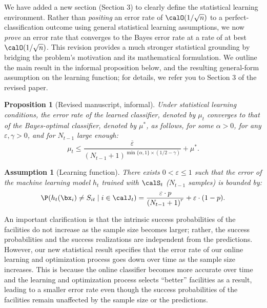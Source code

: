 \documentclass[11pt]{article}
\newtheorem{proposition}{Proposition}[]
\newtheorem{assumption}{Assumption}[]
\begin{document}
We have added a new section (Section 3) to clearly define the statistical learning environment. Rather than \textit{positing} an error rate of $\calO(1/\sqrt n)$ to a perfect-classification outcome using general statistical learning assumptions, we now \textit{prove} an error rate that converges to the Bayes error rate at a rate of at best $\calO(1/\sqrt n)$. This revision provides a much stronger statistical grounding by bridging the problem's motivation and its mathematical formulation. We outline the main result in the informal proposition below, and the resulting general-form assumption on the learning function; for details, we refer you to Section 3 of the revised paper.
\setcounter{proposition}{0}
\begin{proposition}[Revised manuscript, informal]\label{prop:MLE_informal_R3}
       Under statistical learning conditions, the error rate of the learned classifier, denoted by $\mu_t$ converges to that of the Bayes-optimal classifier, denoted by $\mu^*$, as follows, for some $\alpha>0$, for any $\varepsilon,\gamma>0$, and for $N_{t-1}$ large enough:
        \[\mu_t \leq \frac{\overline\varepsilon}{(N_{t-1}+1)^{\min\{\alpha,1\}\times (1/2-\gamma)}}+\mu^*.\]
\end{proposition}
\setcounter{assumption}{3}
\begin{assumption}[Learning function] \label{ass:classification_R3}
    There exists $0<\varepsilon\leq 1$ such that the error of the machine learning model $h_t$ trained with $\calS_t$ ($N_{t-1}$ samples) is bounded by:
    \begin{align*}
        \P(h_t(\bx_{i})\neq S_{it} \mid i \in \calJ_t)=\frac{\varepsilon\cdot p}{\left(N_{t-1} + 1\right)^r}+\varepsilon\cdot(1-p).
    \end{align*}
\end{assumption}

An important clarification is that the intrinsic success probabilities of the facilities do not increase as the sample size becomes larger; rather, the success probabilities and the success realizations are independent from the predictions. However, our new statistical result specifies that the error rate of our online learning and optimization process goes down over time as the sample size increases. This is because the online classifier becomes more accurate over time and the learning and optimization process selects ``better'' facilities as a result, leading to a smaller error rate even though the success probabilities of the facilities remain unaffected by the sample size or the predictions.
\end{document}
